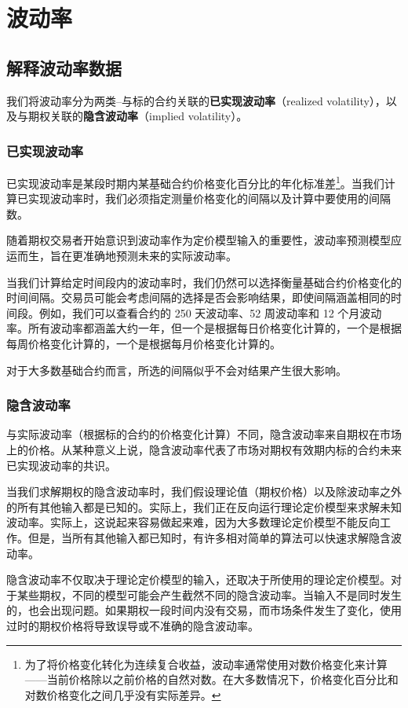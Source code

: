 \chapter{波动率}
\section{解释波动率数据}
我们将波动率分为两类--与标的合约关联的\textbf{已实现波动率}（realized volatility），以及与期权关联的\textbf{隐含波动率}（implied volatility）。
\subsection{已实现波动率}
已实现波动率是某段时期内某基础合约价格变化百分比的年化标准差\footnote{为了将价格变化转化为连续复合收益，波动率通常使用对数价格变化来计算——当前价格除以之前价格的自然对数。在大多数情况下，价格变化百分比和对数价格变化之间几乎没有实际差异。}。当我们计算已实现波动率时，我们必须指定测量价格变化的间隔以及计算中要使用的间隔数。

随着期权交易者开始意识到波动率作为定价模型输入的重要性，波动率预测模型应运而生，旨在更准确地预测未来的实际波动率。

当我们计算给定时间段内的波动率时，我们仍然可以选择衡量基础合约价格变化的时间间隔。交易员可能会考虑间隔的选择是否会影响结果，即使间隔涵盖相同的时间段。例如，我们可以查看合约的 250 天波动率、52 周波动率和 12 个月波动率。所有波动率都涵盖大约一年，但一个是根据每日价格变化计算的，一个是根据每周价格变化计算的，一个是根据每月价格变化计算的。

对于大多数基础合约而言，所选的间隔似乎不会对结果产生很大影响。
\subsection{隐含波动率}
与实际波动率（根据标的合约的价格变化计算）不同，隐含波动率来自期权在市场上的价格。从某种意义上说，隐含波动率代表了市场对期权有效期内标的合约未来已实现波动率的共识。

当我们求解期权的隐含波动率时，我们假设理论值（期权价格）以及除波动率之外的所有其他输入都是已知的。实际上，我们正在反向运行理论定价模型来求解未知波动率。实际上，这说起来容易做起来难，因为大多数理论定价模型不能反向工作。但是，当所有其他输入都已知时，有许多相对简单的算法可以快速求解隐含波动率。

隐含波动率不仅取决于理论定价模型的输入，还取决于所使用的理论定价模型。对于某些期权，不同的模型可能会产生截然不同的隐含波动率。当输入不是同时发生的，也会出现问题。如果期权一段时间内没有交易，而市场条件发生了变化，使用过时的期权价格将导致误导或不准确的隐含波动率。

